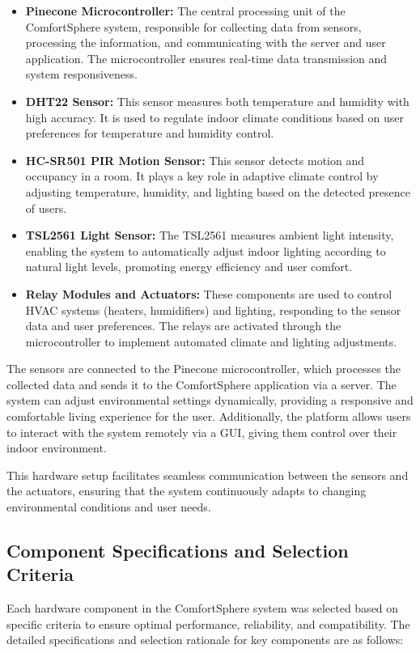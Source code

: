 \documentclass[a4paper]{scrartcl}
\begin{document}
	\begin{itemize}
		\item \textbf{Pinecone Microcontroller:} The central processing unit of the ComfortSphere system, responsible for collecting data from sensors, processing the information, and communicating with the server and user application. The microcontroller ensures real-time data transmission and system responsiveness.
		\item \textbf{DHT22 Sensor:} This sensor measures both temperature and humidity with high accuracy. It is used to regulate indoor climate conditions based on user preferences for temperature and humidity control.
		\item \textbf{HC-SR501 PIR Motion Sensor:} This sensor detects motion and occupancy in a room. It plays a key role in adaptive climate control by adjusting temperature, humidity, and lighting based on the detected presence of users.
		\item \textbf{TSL2561 Light Sensor:} The TSL2561 measures ambient light intensity, enabling the system to automatically adjust indoor lighting according to natural light levels, promoting energy efficiency and user comfort.
		\item \textbf{Relay Modules and Actuators:} These components are used to control HVAC systems (heaters, humidifiers) and lighting, responding to the sensor data and user preferences. The relays are activated through the microcontroller to implement automated climate and lighting adjustments.
	\end{itemize}

	The sensors are connected to the Pinecone microcontroller, which processes the collected data and sends it to the ComfortSphere application via a server. The system can adjust environmental settings dynamically, providing a responsive and comfortable living experience for the user. Additionally, the platform allows users to interact with the system remotely via a GUI, giving them control over their indoor environment.

	This hardware setup facilitates seamless communication between the sensors and the actuators, ensuring that the system continuously adapts to changing environmental conditions and user needs.
    
    \subsection{Component Specifications and Selection Criteria}
    Each hardware component in the ComfortSphere system was selected based on specific criteria to ensure optimal performance, reliability, and compatibility. The detailed specifications and selection rationale for key components are as follows:
    
\end{document}

